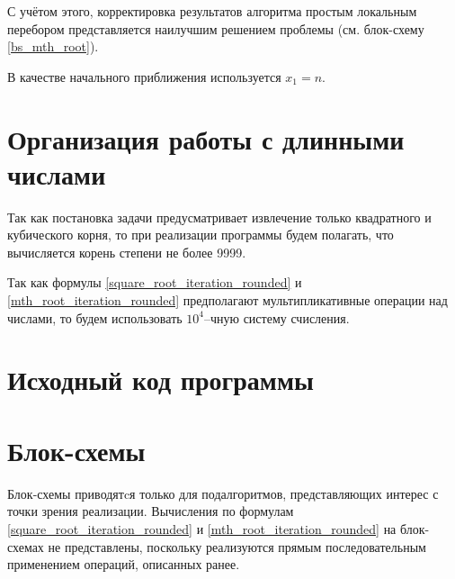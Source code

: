 \documentclass[a4paper,12pt]{article} %
\begin{document}
С учётом этого, корректировка результатов алгоритма простым локальным перебором
представляется наилучшим решением проблемы (см. блок-схему \ref{bs_mth_root}).

В качестве начального приближения используется $x_1=n$.

\section*{Организация работы с длинными числами}
Так как постановка задачи предусматривает извлечение только квадратного и кубического корня,
то при реализации программы будем полагать, что вычисляется корень степени не более 9999.

Так как формулы \eqref{square_root_iteration_rounded} и \eqref{mth_root_iteration_rounded}
предполагают мультипликативные операции над числами,
то будем использовать $10^4$--чную систему счисления.

\section*{Исходный код программы}







\section*{Блок-схемы}

Блок-схемы приводятcя только для подалгоритмов, представляющих интерес с точки зрения реализации.
Вычисления по формулам \eqref{square_root_iteration_rounded} и \eqref{mth_root_iteration_rounded}
на блок-схемах не представлены,
поскольку реализуются прямым последовательным применением операций, описанных ранее.
\end{document}
